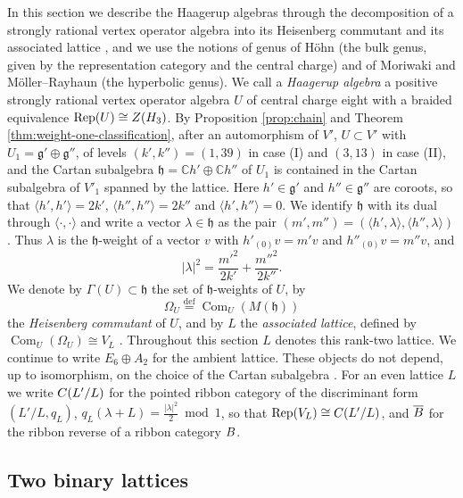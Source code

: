 \documentclass[leqno]{article}
\newcommand{\Cbb}{\ensuremath{\mathbb{C}}}
\let\cal\relax
\newcommand{\cal}{\mathcal}
\newcommand{\la}{\langle}
\newcommand{\ra}{\rangle}
\newcommand{\ov}{\overset}
\DeclareMathOperator{\Rep}{Rep}
\numberwithin{equation}{section}
\begin{document}
In this section we describe the Haagerup algebras through the decomposition of a strongly rational vertex operator algebra into its Heisenberg commutant and its associated lattice \cite{Mas14,Hoh17,MoR24a}, and we use the notions of genus of Höhn \cite{Hoh03} (the bulk genus, given by the representation category and the central charge) and of Moriwaki \cite{Mor21} and Möller--Rayhaun \cite{MoR24a} (the hyperbolic genus). We call a \emph{Haagerup algebra} a positive strongly rational vertex operator algebra $U$ of central charge eight with a braided equivalence $\Rep(U) \cong Z(\cal H_3)$. By Proposition \ref{prop:chain} and Theorem \ref{thm:weight-one-classification}, after an automorphism of $V'$, $U \subset V'$ with $U_1 = \mathfrak g' \oplus \mathfrak g''$, of levels $(k',k'') = (1,39)$ in case (I) and $(3,13)$ in case (II), and the Cartan subalgebra $\mathfrak h = \Cbb h' \oplus \Cbb h''$ of $U_1$ is contained in the Cartan subalgebra of $V'_1$ spanned by the lattice. Here $h' \in \mathfrak g'$ and $h'' \in \mathfrak g''$ are coroots, so that $\la h',h'\ra = 2k'$, $\la h'',h''\ra = 2k''$ and $\la h',h''\ra = 0$. We identify $\mathfrak h$ with its dual through $\la\cdot,\cdot\ra$ and write a vector $\lambda \in \mathfrak h$ as the pair $(m',m'') = (\la h',\lambda\ra,\la h'',\lambda\ra)$. Thus $\lambda$ is the $\mathfrak h$-weight of a vector $v$ with $h'_{(0)}v = m'v$ and $h''_{(0)}v = m''v$, and
\[
|\lambda|^2 = \frac{m'^2}{2k'}+\frac{m''^2}{2k''}.
\]
We denote by $\Gamma(U) \subset \mathfrak h$ the set of $\mathfrak h$-weights of $U$, by
\[
\Omega_U \ov{\mathrm{def}}{=} \operatorname{Com}_U(M(\mathfrak h))
\]
the \emph{Heisenberg commutant} of $U$, and by $L$ the \emph{associated lattice}, defined by $\operatorname{Com}_U(\Omega_U) \cong V_L$ \cite[Definition 2.12]{MoR24a}. Throughout this section $L$ denotes this rank-two lattice. We continue to write $E_6 \oplus A_2$ for the ambient lattice. These objects do not depend, up to isomorphism, on the choice of the Cartan subalgebra \cite[Remark 2.13]{MoR24a}. For an even lattice $L$ we write $\cal C(L'/L)$ for the pointed ribbon category of the discriminant form $(L'/L,q_L)$, $q_L(\lambda+L) = \frac{|\lambda|^2}2 \bmod 1$, so that $\Rep(V_L) \cong \cal C(L'/L)$, and $\overline{\cal B}$ for the ribbon reverse of a ribbon category $\cal B$.

\subsection{Two binary lattices}
\end{document}
